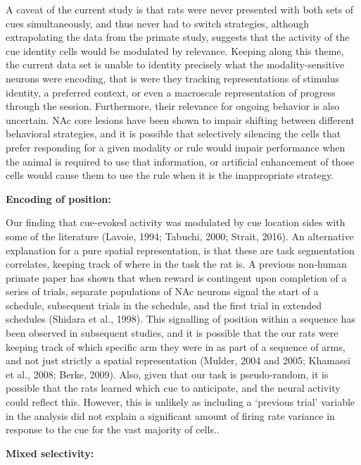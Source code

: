 \documentclass[11pt]{article}
\begin{document}
A caveat of the current study is that rats were never presented with both sets of cues simultaneously, and thus never had to switch strategies, although extrapolating the data from the primate study, suggests that the activity of the cue identity cells would be modulated by relevance. Keeping along this theme, the current data set is unable to identity precisely what the modality-sensitive neurons were encoding, that is were they tracking representations of stimulus identity, a preferred context, or even a macroscale representation of progress through the session. Furthermore, their relevance for ongoing behavior is also uncertain. NAc core lesions have been shown to impair shifting between different behavioral strategies, and it is possible that selectively silencing the cells that prefer responding for a given modality or rule would impair performance when the animal is required to use that information, or artificial enhancement of those cells would cause them to use the rule when it is the inappropriate strategy.

{\bf Encoding of position:}

Our finding that cue-evoked activity was modulated by cue location sides with some of the literature (Lavoie, 1994; Tabuchi, 2000; Strait, 2016). An alternative explanation for a pure spatial representation, is that these are task segmentation correlates, keeping track of where in the task the rat is. A previous non-human primate paper has shown that when reward is contingent upon completion of a series of trials, separate populations of NAc neurons signal the start of a schedule, subsequent trials in the schedule, and the first trial in extended schedules (Shidara et al., 1998). This signalling of position within a sequence has been observed in subsequent studies, and it is possible that the our rats were keeping track of which specific arm they were in as part of a sequence of arms, and not just strictly a spatial representation (Mulder, 2004 and 2005; Khamassi et al., 2008; Berke, 2009). Also, given that our task is pseudo-random, it is possible that the rats learned which cue to anticipate, and the neural activity could reflect this. However, this is unlikely as including a ‘previous trial’ variable in the analysis did not explain a significant amount of firing rate variance in response to the cue for the vast majority of cells..

{\bf Mixed selectivity:}
\end{document}

